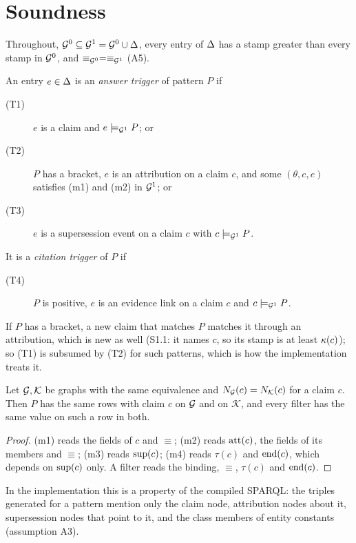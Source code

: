 \section{Soundness}\label{sec:s-soundness}

Throughout, $\mathcal G^0\subseteq\mathcal G^1=\mathcal G^0\cup\Delta$, every entry of $\Delta$ has a stamp greater than
every stamp in $\mathcal G^0$, and $\equiv_{\mathcal G^0}=\equiv_{\mathcal G^1}$ (A5).

\begin{definition}[Triggers]\label{def:triggers}
An entry $e\in\Delta$ is an \emph{answer trigger} of pattern $P$ if
\begin{description}
\item[(T1)] $e$ is a claim and $e\models_{\mathcal G^1}P$; or
\item[(T2)] $P$ has a bracket, $e$ is an attribution on a claim $c$, and some $(\theta,c,e)$
  satisfies (m1) and (m2) in $\mathcal G^1$; or
\item[(T3)] $e$ is a supersession event on a claim $c$ with $c\models_{\mathcal G^1}P$.
\end{description}
It is a \emph{citation trigger} of $P$ if
\begin{description}
\item[(T4)] $P$ is positive, $e$ is an evidence link on a claim $c$ and $c\models_{\mathcal G^1}P$.
\end{description}
\end{definition}

\noindent If $P$ has a bracket, a new claim that matches $P$ matches it through an attribution,
which is new as well (S1.1: it names $c$, so its stamp is at least $\kappa(c)$); so (T1) is
subsumed by (T2) for such patterns, which is how the implementation treats it.

\begin{lemma}[Locality]\label{lem:locality}
Let $\mathcal G,\mathcal K$ be graphs with the same equivalence and $N_\mathcal G(c)=N_{\mathcal K}(c)$ for a
claim $c$. Then $P$ has the same rows with claim $c$ on $\mathcal G$ and on $\mathcal K$, and every filter
has the same value on such a row in both.
\end{lemma}
\begin{proof}
(m1) reads the fields of $c$ and $\equiv$; (m2) reads $\mathrm{att}(c)$, the fields of its members and
$\equiv$; (m3) reads $\mathrm{sup}(c)$; (m4) reads $\tau(c)$ and $\mathrm{end}(c)$, which depends on
$\mathrm{sup}(c)$ only. A filter reads the binding, $\equiv$, $\tau(c)$ and $\mathrm{end}(c)$.
\end{proof}

\noindent In the implementation this is a property of the compiled SPARQL: the triples generated
for a pattern mention only the claim node, attribution nodes about it, supersession nodes that
point to it, and the class members of entity constants (assumption A3).

